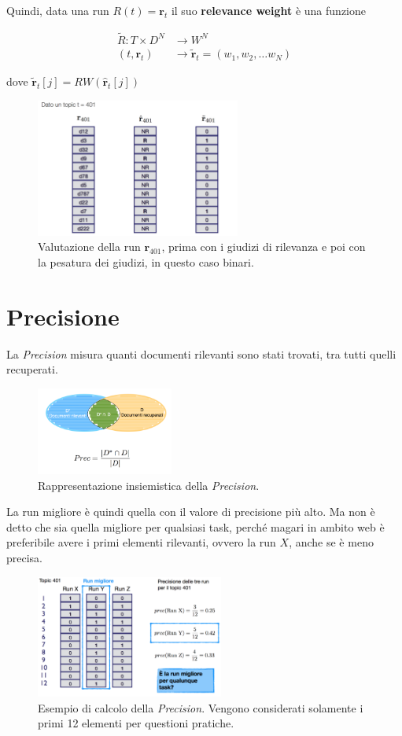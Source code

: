 \noindent Quindi, data una run $R(t) = \mathbf{r}_t$ il suo \textbf{relevance weight} è una funzione

\begin{align*}
	\tilde{R}: T \times D^N &\to W^N \\
				(t, \mathbf{r}_t) &\to \tilde{\mathbf{r}}_t = (w_1, w_2, \ldots w_N)
\end{align*}

\noindent dove $\tilde{\mathbf{r}}_t[j] = RW(\hat{\mathbf{r}}_t[j])$

\begin{figure}[htbp]
	\centering
	\includegraphics[width=0.6\textwidth]{images/l14-fig-9.png}
	\caption{Valutazione della run $\mathbf{r}_{401}$, prima con i giudizi di rilevanza e poi con la pesatura dei giudizi, in questo caso binari.}
\end{figure}
\FloatBarrier
\section{Precisione}

La \textit{Precision} misura quanti documenti rilevanti sono stati trovati, tra tutti quelli recuperati.

\begin{figure}[htbp]
	\centering
	\includegraphics[width=0.4\textwidth]{images/l14-fig-10.png}
	\caption{Rappresentazione insiemistica della \textit{Precision}.}
\end{figure}
\FloatBarrier
\noindent La run migliore è quindi quella con il valore di precisione più alto. 
Ma non è detto che sia quella migliore per qualsiasi task, perché magari in ambito web è preferibile avere i primi elementi rilevanti, ovvero la run $X$, anche se è meno precisa.


\begin{figure}[htbp]
	\centering
	\includegraphics[width=0.55\textwidth]{images/l14-fig-11.png}
	\caption{Esempio di calcolo della \textit{Precision}. Vengono considerati solamente i primi 12 elementi per questioni pratiche.}
\end{figure}





